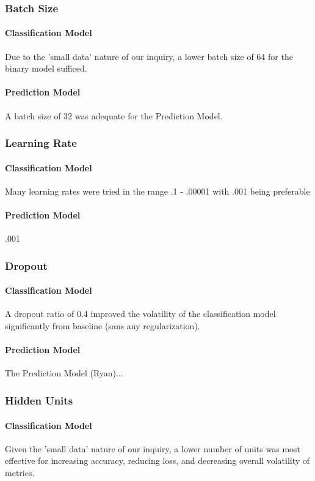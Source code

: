 \documentclass{article}
\begin{document}
\begin{multicols}{2}
\subsubsection{Batch Size}
\paragraph{Classification Model}
Due to the 'small data' nature of our inquiry, a lower batch size of 64 for the binary model sufficed.
\paragraph{Prediction Model}
A batch size of 32 was adequate for the Prediction Model.
\subsubsection{Learning Rate}
\paragraph{Classification Model}
Many learning rates were tried in the range .1 - .00001 with .001 being preferable
\paragraph{Prediction Model}
.001
\subsubsection{Dropout}
\paragraph{Classification Model}
A dropout ratio of 0.4 improved the volatility of the classification model significantly from baseline (sans any regularization).
\paragraph{Prediction Model}
The Prediction Model (Ryan)...
\subsubsection{Hidden Units}
\paragraph{Classification Model}
Given the 'small data' nature of our inquiry, a lower number of units was most effective for increasing accuracy, reducing loss, and decreasing overall volatility of metrics.

\end{multicols}
\end{document}
